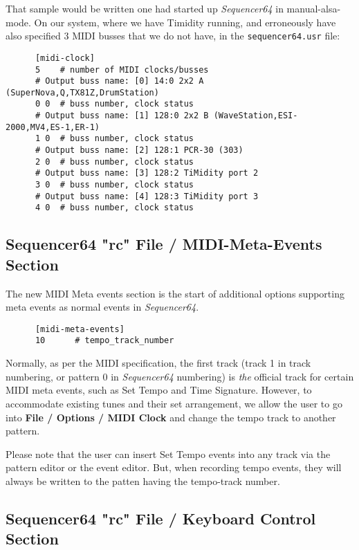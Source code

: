    That sample would be written one had started up \textsl{Sequencer64} in
   manual-alsa-mode.  On our system, where we have Timidity running, and
   erroneously have also specified 3 MIDI busses that we do not have, in the
   \texttt{sequencer64.usr} file:

   \begin{verbatim}
      [midi-clock]
      5    # number of MIDI clocks/busses
      # Output buss name: [0] 14:0 2x2 A (SuperNova,Q,TX81Z,DrumStation)
      0 0  # buss number, clock status
      # Output buss name: [1] 128:0 2x2 B (WaveStation,ESI-2000,MV4,ES-1,ER-1)
      1 0  # buss number, clock status
      # Output buss name: [2] 128:1 PCR-30 (303)
      2 0  # buss number, clock status
      # Output buss name: [3] 128:2 TiMidity port 2
      3 0  # buss number, clock status
      # Output buss name: [4] 128:3 TiMidity port 3
      4 0  # buss number, clock status
   \end{verbatim}

\subsection{Sequencer64 "rc" File / MIDI-Meta-Events Section}
\label{subsec:seq64_rc_file_midi_meta_events}

   The new MIDI Meta events section is the start of additional options
   supporting meta events as normal events in \textsl{Sequencer64}.

   \begin{verbatim}
      [midi-meta-events]
      10      # tempo_track_number
   \end{verbatim}

   Normally, as per the MIDI specification, the first track (track 1 in track
   numbering, or pattern 0 in \textsl{Sequencer64} numbering) is \textsl{the}
   official track for certain MIDI meta events, such as Set Tempo and Time
   Signature.  However, to accommodate existing tunes and their set
   arrangement, we allow the user to go into \textbf{File / Options / MIDI
   Clock} and change the tempo track to another pattern.

   Please note that the user can insert Set Tempo events into any track via the
   pattern editor or the event editor.  But, when recording tempo events, they
   will always be written to the patten having the tempo-track number.

\subsection{Sequencer64 "rc" File / Keyboard Control Section}
\label{subsec:seq64_rc_file_keyboard_control}
        
